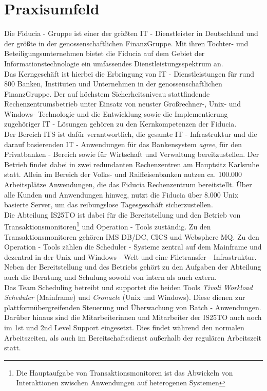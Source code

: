 \section{Praxisumfeld}
Die Fiducia - Gruppe ist einer der größten IT - Dienstleister in Deutschland und der größte in der genossenschaftlichen FinanzGruppe. 
Mit ihren Tochter- und Beteiligungsunternehmen bietet die \ac{Fiducia} auf dem Gebiet der Informationstechnologie ein umfassendes Dienstleistungsspektrum an.\\
Das Kerngeschäft ist hierbei die Erbringung von IT - Dienstleistungen für rund 800 Banken, Instituten und Unternehmen in der genossenschaftlichen FinanzGruppe.
Der auf höchstem Sicherheitsniveau stattfindende Rechenzentrumsbetrieb unter Einsatz von neuster Großrechner-, Unix- und Windows- Technologie und die Entwicklung
sowie die Implementierung zugehöriger IT - Lösungen gehören zu den Kernkompetenzen der Fiducia. \cite{testitest} \\
Der Bereich \ac{ITS} ist dafür verantwortlich, die gesamte IT - Infrastruktur und die darauf basierenden IT - Anwendungen für das Bankensystem \textit{agree}, 
für den Privatbanken - Bereich sowie für Wirtschaft und Verwaltung bereitzustellen. Der Betrieb findet dabei in zwei redundanten Rechenzentren am Hauptsitz Karlsruhe statt. Allein im Bereich der Volks- und Raiffeisenbanken nutzen ca. 100.000 Arbeitsplätze Anwendungen, die das Fiducia Rechenzentrum bereitstellt. Über alle Kunden und Anwendungen hinweg, nutzt die Fiducia über 8.000 Unix basierte Server, um das reibungslose Tagesgeschäft sicherzustellen.\\
Die Abteilung \ac{IS25TO} ist dabei für die Bereitstellung und den Betrieb von Transaktionsmonitoren\footnote{Die Hauptaufgabe von Transaktionsmonitoren ist das Abwickeln von Interaktionen zwischen Anwendungen auf heterogenen Systemen} und Operation - Tools zuständig. Zu den Transaktionsmonitoren gehören IMS DB/DC, CICS und Websphere MQ. Zu den Operation - Tools zählen die Scheduler - Systeme zentral auf dem Mainframe und dezentral in der Unix und Windows - Welt und eine Filetransfer - Infrastruktur. Neben der Bereitstellung und des Betriebs gehört zu den Aufgaben der Abteilung auch die Beratung und Schulung sowohl von intern als auch extern.\\
Das Team Scheduling betreibt und supportet die beiden Tools \textit{Tivoli Workload Scheduler} (Mainframe) und \textit{Cronacle} (Unix und Windows). 
Diese dienen zur plattformübergreifenden Steuerung und Überwachung von Batch - Anwendungen.\\
Darüber hinaus sind die Mitarbeiterinnen und Mitarbeiter der \ac{IS25TO} auch noch im 1st und 2nd Level Support eingesetzt. Dies findet während den normalen Arbeitszeiten, als auch im Bereitschaftsdienst außerhalb der regulären Arbeitszeit statt.

